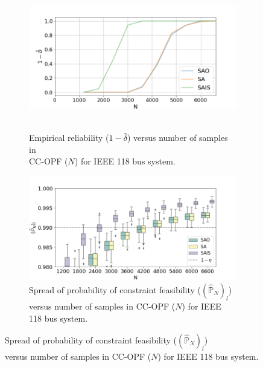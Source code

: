 \begin{figure}[hbt]
\begin{subfigure}{.48\textwidth}
  \centering
  \hspace{-4mm}\includegraphics[width=0.9\linewidth]{Dissertation/images/dc_stochastic_approx/ieee118/1_beta_N_7800_eta_001.png}~~~~~~\hfill
  \caption{Empirical reliability ($1-\hat{\delta}$) versus number of samples in \\CC-OPF ($N$) for IEEE 118 bus system.}
  \label{fig:ieee118reliability}
\end{subfigure}
\begin{subfigure}{.48\textwidth}
  \centering
  \hspace{-8mm}\includegraphics[width=0.9\linewidth]{Dissertation/images/dc_stochastic_approx/ieee118/boxplot_J_N_6600_eta_001.png}
  \caption{Spread of probability of constraint feasibility ($(\hat{\mathbb{P}}_N)_l$) \\versus number of samples in CC-OPF ($N$) for IEEE 118 bus system.}
  \label{fig:ieee118conservatism}
\end{subfigure}

\end{figure}
